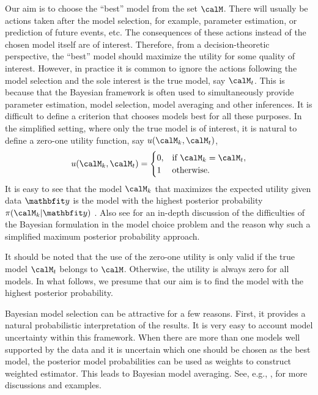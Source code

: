 Our aim is to choose the ``best'' model from the set $\calM$. There will
usually be actions taken after the model selection, for example, parameter
estimation, or prediction of future events, etc. The consequences of these
actions instead of the chosen model itself are of interest. Therefore, from a
decision-theoretic perspective, the ``best'' model should maximize the
utility for some quality of interest. However, in practice it is common to
ignore the actions following the model selection and the sole interest is the
true model, say $\calM_t$. This is because that the Bayesian framework is
often used to simultaneously provide parameter estimation, model selection,
model averaging and other inferences. It is difficult to define a criterion
that chooses models best for all these purposes. In the simplified setting,
where only the true model is of interest, it is natural to define a zero-one
utility function, say $u(\calM_k,\calM_t)$,
\begin{equation}
  u(\calM_k,\calM_t) =
  \begin{cases}
    0, &\text{if } \calM_k = \calM_t,\\
    1  &\text{otherwise.}
  \end{cases}
\end{equation}
It is easy to see that the model $\calM_k$ that maximizes the expected
utility given data $\data$ is the model with the highest posterior
probability $\pi(\calM_k|\data)$ \cite[][chap.~6]{Bernardo:1994vd}. Also see
\cite[][sec.~7.2.1]{Robert:2007tc} for an in-depth discussion of the
difficulties of the Bayesian formulation in the model choice problem and the
reason why such a simplified maximum posterior probability approach.

It should be noted that the use of the zero-one utility is only valid if the
true model $\calM_t$ belongs to $\calM$. Otherwise, the utility is always zero
for all models. In what follows, we presume that our aim is to find the model
with the highest posterior probability.

Bayesian model selection can be attractive for a few reasons. First, it
provides a natural probabilistic interpretation of the results. It is very
easy to account model uncertainty within this framework. When there are more
than one models well supported by the data and it is uncertain which one
should be chosen as the best model, the posterior model probabilities can be
used as weights to construct weighted estimator. This leads to Bayesian model
averaging. See, e.g., \cite{Raftery:1997vx,Clyde:1999vx,Draper:1995vx}, for
more discussions and examples.

